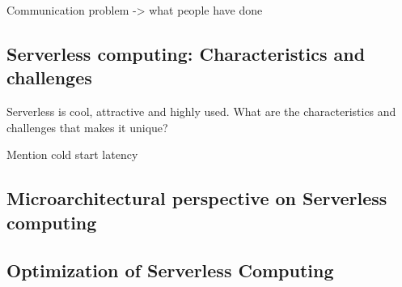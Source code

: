 \documentclass[../main.tex]{subfiles}
\begin{document}
\begin{refsection}
Communication problem -> what people have done

\subsection{Serverless computing: Characteristics and challenges}
Serverless is cool, attractive and highly used. What are the characteristics and challenges that makes it unique?

Mention cold start latency

\subsection{Microarchitectural perspective on Serverless computing}


\subsection{Optimization of Serverless Computing}



\ifx\chapincluded\undefined
  \printbibliography
  \end{refsection}
 \fi
\end{document}
